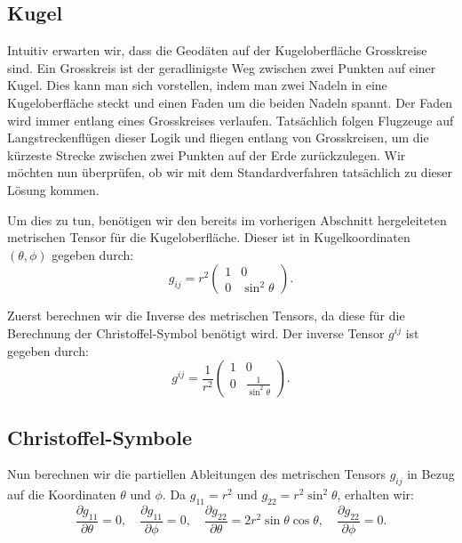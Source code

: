 %
%
%
%
\subsection{Kugel\label{geodaeten:section:Standardverfahren:Kugel}}

Intuitiv erwarten wir, dass die Geodäten auf der Kugeloberfläche Grosskreise sind.
Ein Grosskreis ist der geradlinigste Weg zwischen zwei Punkten auf einer Kugel.
Dies kann man sich vorstellen, indem man zwei Nadeln in eine Kugeloberfläche steckt und einen Faden um die beiden Nadeln spannt.
Der Faden wird immer entlang eines Grosskreises verlaufen.
Tatsächlich folgen Flugzeuge auf Langstreckenflügen dieser Logik und fliegen entlang von Grosskreisen, um die kürzeste Strecke zwischen zwei Punkten auf der Erde zurückzulegen.
Wir möchten nun überprüfen, ob wir mit dem Standardverfahren tatsächlich zu dieser Lösung kommen.

Um dies zu tun, benötigen wir den bereits im vorherigen Abschnitt hergeleiteten metrischen Tensor für die Kugeloberfläche.
Dieser ist in Kugelkoordinaten $(\theta, \phi)$ gegeben durch:
\begin{equation}
	g_{ij} = r^2 \begin{pmatrix}
		1 & 0 \\
		0 & \sin^2\theta
	\end{pmatrix}.
\end{equation}

Zuerst berechnen wir die Inverse des metrischen Tensors, da diese für die Berechnung der Christoffel-Symbol benötigt wird.
Der inverse Tensor $g^{ij}$ ist gegeben durch:
\begin{equation}
	g^{ij} = \frac{1}{r^2} 
	\begin{pmatrix}
		1 & 0 \\
		0 & \frac{1}{\sin^2\theta}
	\end{pmatrix}.
\end{equation}

\subsection{Christoffel-Symbole}
Nun berechnen wir die partiellen Ableitungen des metrischen Tensors $g_{ij}$ in Bezug auf die Koordinaten $\theta$ und $\phi$.
Da $g_{11} = r^2$ und $g_{22} = r^2 \sin^2\theta$, erhalten wir:
\begin{equation}
	\frac{\partial g_{11}}{\partial \theta} = 0, \quad \frac{\partial g_{11}}{\partial \phi} = 0, \quad \frac{\partial g_{22}}{\partial \theta} = 2r^2 \sin\theta \cos\theta, \quad \frac{\partial g_{22}}{\partial \phi} = 0.
\end{equation}

